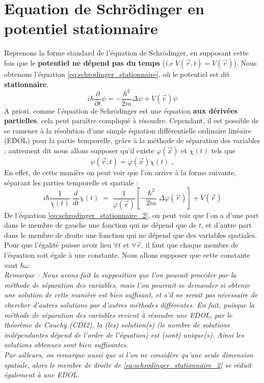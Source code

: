 \documentclass{book}
\begin{document}
\section{Equation de Schrödinger en potentiel stationnaire}
Reprenons la forme standard de l'équation de Schrödinger, en supposant cette fois que le \textbf{potentiel ne dépend pas du temps} (\textit{i.e} $V(\vec{r}, t) = V(\vec{r})$). Nous obtenons l'équation \eqref{eq:schrodinger_stationnaire}, où le potentiel est dit \textbf{stationnaire}. 
\begin{equation} \label{eq:schrodinger_stationnaire}
i\hbar \dfrac{\partial}{\partial t} \psi = -\dfrac{\hbar ^2}{2m} \Delta \psi + V(\vec r) \psi
\end{equation}
A priori, comme l'équation de Schrödinger est une équation \textbf{aux dérivées partielles}, cela peut paraître compliqué à résoudre. 
Cependant, il est possible de se ramener à la résolution d'une simple équation différentielle ordinaire linéaire (EDOL) pour la partie temporelle, grâce à la méthode de séparation des variables ; autrement dit nous allons supposer qu'il existe $\varphi(\vec x)$ et $\chi(t)$ tels que $$\psi(\vec r, t) = \varphi(\vec x) \chi(t)\; ,$$
En effet, de cette manière on peut voir que l'on arrive à la forme suivante, séparant les parties temporelle et spatiale :
\begin{equation}
i\hbar \dfrac{1}{\chi(t)} \; \dfrac{d}{dt} \chi(t) \; = \; \dfrac{1}{\varphi(\vec r)} \left[ -\dfrac{\hbar ^2}{2m} \; \Delta \varphi(\vec r) \right] + V(\vec r)
\label{eq:schrodinger_stationnaire_2}
\end{equation}
De l'équation \eqref{eq:schrodinger_stationnaire_2}, on peut voir que l'on a d'une part dans le membre de gauche une fonction qui ne dépend que de $t$, et d'autre part dans le membre de droite une fonction qui ne dépend que des variables spatiales. \\
Pour que l'égalité puisse avoir lieu $\forall t$ et $\forall \vec{r}$, il faut que chaque membre de l'équation soit égale à une constante. Nous allons supposer que cette constante vaut $\hbar \omega$. \\

\textit{Remarque : Nous avons fait la supposition que l'on pouvait procéder par la méthode de séparation des variables, mais l'on pourrait se demander si obtenir une solution de cette manière est bien suffisant, et s'il ne serait pas nécessaire de chercher d'autres solutions par d'autres méthodes différentes. 
En fait, puisque la méthode de séparation des variables revient à résoudre une EDOL, par le théorème de Cauchy (CDI2), la (les) solution(s) (le nombre de solutions indépendantes dépend de l'ordre de l'équation) est (sont) unique(s). Ainsi les solutions obtenues sont bien suffisantes. \\
Par ailleurs, on remarque aussi que si l'on ne considère qu'une seule dimension spatiale, alors le membre de droite de \eqref{eq:schrodinger_stationnaire_2} se réduit également à une EDOL.}
\end{document}
